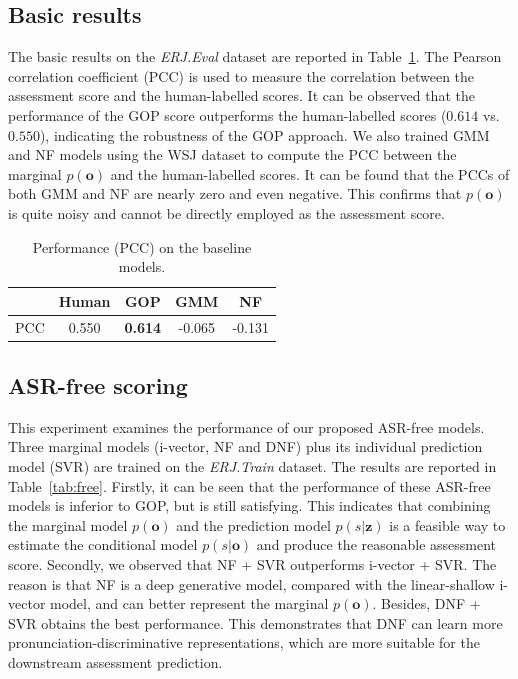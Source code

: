 \documentclass[a4paper]{article}
\begin{document}
\subsection{Basic results}

\noindent The basic results on the \emph{ERJ.Eval} dataset are reported in Table~\ref{tab:basic}.
The Pearson correlation coefficient (PCC) is used to measure the correlation between the assessment score and the human-labelled scores.
It can be observed that the performance of the GOP score outperforms the human-labelled scores ($0.614$ vs. $0.550$),
indicating the robustness of the GOP approach.
We also trained GMM and NF models using the WSJ dataset to compute the PCC between the marginal $p(\mathbf{o})$
and the human-labelled scores. It can be found that the PCCs of both GMM and NF are nearly zero and even negative.
This confirms that $p(\mathbf{o})$ is quite noisy and cannot be directly employed as the assessment score.

\begin{table}[htb!]
 \begin{center}
  \caption{Performance (PCC) on the baseline models.}
  \vspace{-2mm}
   \label{tab:basic}
     \begin{tabular}{l|c|c|c|c}
       \hline
                            &  Human  &   GOP    &   GMM     &   NF     \\
       \hline
             PCC            &  0.550  &   \textbf{0.614}  &   -0.065  &   -0.131    \\
       \hline
     \end{tabular}
 \end{center}
\end{table}

\vspace{-4mm}


\subsection{ASR-free scoring}

This experiment examines the performance of our proposed ASR-free models.
Three marginal models (i-vector, NF and DNF) plus its individual prediction model (SVR) are trained on the \emph{ERJ.Train} dataset.
The results are reported in Table~\ref{tab:free}.
Firstly, it can be seen that the performance of these ASR-free models is inferior to GOP, but is still satisfying.
This indicates that combining the marginal model $p(\mathbf{o})$ and the prediction model $p(s|\mathbf{z})$
is a feasible way to estimate the conditional model $p(s|\mathbf{o})$ and produce the reasonable assessment score.
Secondly, we observed that NF + SVR outperforms i-vector + SVR. The reason is that
NF is a deep generative model, compared with the linear-shallow i-vector model, and can better represent the marginal $p(\mathbf{o})$.
Besides, DNF + SVR obtains the best performance.
This demonstrates that DNF can learn more pronunciation-discriminative representations,
which are more suitable for the downstream assessment prediction.
\end{document}
